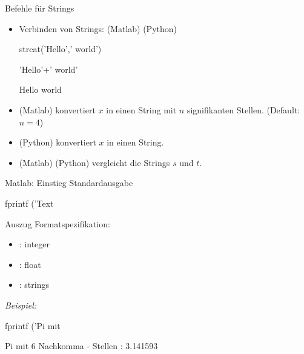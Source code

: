 \documentclass[hyperref={xetex}]{beamer}
\begin{document}
%
%
\begin{frame}[fragile]{Befehle für Strings}
\begin{itemize}
\item Verbinden von Strings: (Matlab) \isage{+}(Python)  
\begin{matlabin}
strcat('Hello',' world') 
\end{matlabin}
\begin{pyin}
'Hello'+' world'
\end{pyin}
\begin{matlab}
Hello world 
\end{matlab}
\item {}(Matlab) konvertiert $x$ in einen String mit $n$
  signifikanten Stellen. (Default: $n=4$)
\item {}(Python) konvertiert $x$ in einen String.
\item {}(Matlab) (Python) vergleicht die Strings $s$ und $t$. 
\end{itemize}
\end{frame}

\begin{frame}[fragile]{Matlab: Einstieg Standardausgabe}
\begin{matlabin}
fprintf ('Text %
\end{matlabin}
Auszug Formatspezifikation:
\begin{itemize}
\item  {} : integer
\item {} : float
\item {} : strings
\end{itemize}
\emph{Beispiel:}
\begin{matlabin}
fprintf ('Pi mit %
\end{matlabin}
\begin{matlab}
Pi mit 6 Nachkomma - Stellen : 3.141593
\end{matlab}
\end{frame}
\end{document}
